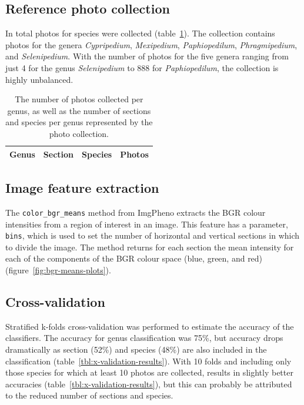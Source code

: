 \documentclass[3p,twocolumn,10pt]{elsarticle}
\begin{document}
\subsection{Reference photo collection}

In total {\PhotoCount} photos for {\SpeciesCount} species were collected (table~\ref{tbl:photo-counts}). The collection contains photos for the genera \textit{Cypripedium}, \textit{Mexipedium}, \textit{Paphiopedilum}, \textit{Phragmipedium}, and \textit{Selenipedium}. With the number of photos for the five genera ranging from just 4 for the genus \textit{Selenipedium} to 888 for \textit{Paphiopedilum}, the collection is highly unbalanced.

\begin{table}[h]\footnotesize
    \caption{The number of photos collected per genus, as well as the number of sections and species per genus represented by the photo collection.}
    \begin{center}
    \begin{tabular}{llll}
    \toprule
    \textbf{Genus} & \textbf{Section} & \textbf{Species} & \textbf{Photos} \\
    \midrule
    
    \bottomrule
    \end{tabular}
    \end{center}
    \label{tbl:photo-counts}
\end{table}

\subsection{Image feature extraction}

The \verb/color_bgr_means/ method from ImgPheno extracts the BGR colour intensities from a region of interest in an image. This feature has a parameter, \verb/bins/, which is used to set the number of horizontal and vertical sections in which to divide the image. The method returns for each section the mean intensity for each of the components of the BGR colour space (blue, green, and red) (figure~\ref{fig:bgr-means-plots}).

\subsection{Cross-validation}

Stratified k-folds cross-validation was performed to estimate the accuracy of the classifiers. The accuracy for genus classification was 75\%, but accuracy drops dramatically as section (52\%) and species (48\%) are also included in the classification (table~\ref{tbl:x-validation-results}). With 10 folds and including only those species for which at least 10 photos are collected, results in slightly better accuracies (table~\ref{tbl:x-validation-results}), but this can probably be attributed to the reduced number of sections and species.
\end{document}
